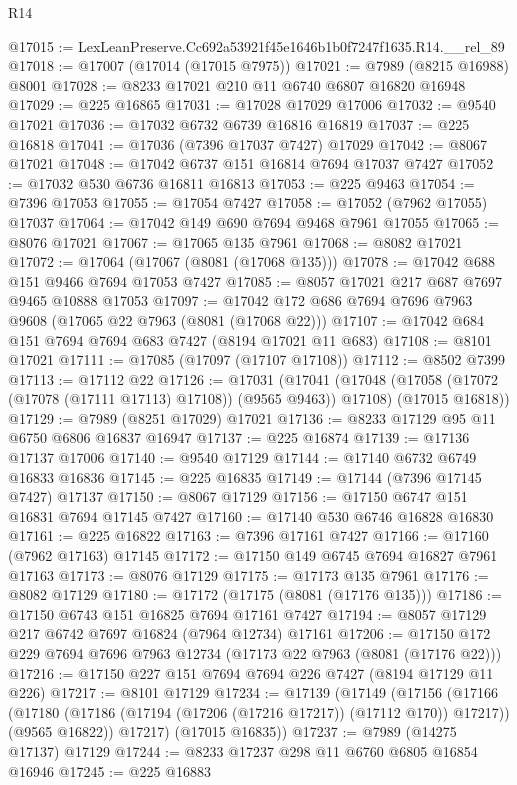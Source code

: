 \begin{lexlean}{R14}
\begin{coremodule}
@17015 := LexLeanPreserve.Cc692a53921f45e1646b1b0f7247f1635.R14.__rel_89
@17018 := @17007 (@17014 (@17015 @7975))
@17021 := @7989 (@8215 @16988) @8001
@17028 := @8233 @17021 @210 @11 @6740 @6807 @16820 @16948
@17029 := @225 @16865
@17031 := @17028 @17029 @17006
@17032 := @9540 @17021
@17036 := @17032 @6732 @6739 @16816 @16819
@17037 := @225 @16818
@17041 := @17036 (@7396 @17037 @7427) @17029
@17042 := @8067 @17021
@17048 := @17042 @6737 @151 @16814 @7694 @17037 @7427
@17052 := @17032 @530 @6736 @16811 @16813
@17053 := @225 @9463
@17054 := @7396 @17053
@17055 := @17054 @7427
@17058 := @17052 (@7962 @17055) @17037
@17064 := @17042 @149 @690 @7694 @9468 @7961 @17055
@17065 := @8076 @17021
@17067 := @17065 @135 @7961
@17068 := @8082 @17021
@17072 := @17064 (@17067 (@8081 (@17068 @135)))
@17078 := @17042 @688 @151 @9466 @7694 @17053 @7427
@17085 := @8057 @17021 @217 @687 @7697 @9465 @10888 @17053
@17097 := @17042 @172 @686 @7694 @7696 @7963 @9608 (@17065 @22 @7963 (@8081 (@17068 @22)))
@17107 := @17042 @684 @151 @7694 @7694 @683 @7427 (@8194 @17021 @11 @683)
@17108 := @8101 @17021
@17111 := @17085 (@17097 (@17107 @17108))
@17112 := @8502 @7399
@17113 := @17112 @22
@17126 := @17031
    (@17041
      (@17048 (@17058 (@17072 (@17078 (@17111 @17113) @17108)) (@9565 @9463)) @17108)
      (@17015 @16818))
@17129 := @7989 (@8251 @17029) @17021
@17136 := @8233 @17129 @95 @11 @6750 @6806 @16837 @16947
@17137 := @225 @16874
@17139 := @17136 @17137 @17006
@17140 := @9540 @17129
@17144 := @17140 @6732 @6749 @16833 @16836
@17145 := @225 @16835
@17149 := @17144 (@7396 @17145 @7427) @17137
@17150 := @8067 @17129
@17156 := @17150 @6747 @151 @16831 @7694 @17145 @7427
@17160 := @17140 @530 @6746 @16828 @16830
@17161 := @225 @16822
@17163 := @7396 @17161 @7427
@17166 := @17160 (@7962 @17163) @17145
@17172 := @17150 @149 @6745 @7694 @16827 @7961 @17163
@17173 := @8076 @17129
@17175 := @17173 @135 @7961
@17176 := @8082 @17129
@17180 := @17172 (@17175 (@8081 (@17176 @135)))
@17186 := @17150 @6743 @151 @16825 @7694 @17161 @7427
@17194 := @8057 @17129 @217 @6742 @7697 @16824 (@7964 @12734) @17161
@17206 := @17150 @172 @229 @7694 @7696 @7963 @12734 (@17173 @22 @7963 (@8081 (@17176 @22)))
@17216 := @17150 @227 @151 @7694 @7694 @226 @7427 (@8194 @17129 @11 @226)
@17217 := @8101 @17129
@17234 := @17139
    (@17149
      (@17156
        (@17166
          (@17180 (@17186 (@17194 (@17206 (@17216 @17217)) (@17112 @170)) @17217))
          (@9565 @16822))
        @17217)
      (@17015 @16835))
@17237 := @7989 (@14275 @17137) @17129
@17244 := @8233 @17237 @298 @11 @6760 @6805 @16854 @16946
@17245 := @225 @16883

\end{coremodule}
\end{lexlean}
